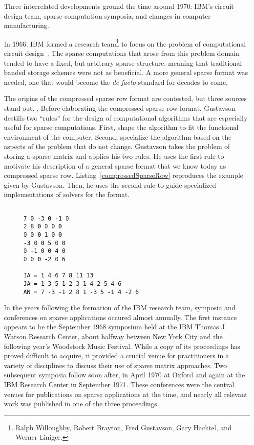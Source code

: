 Three interrelated developments ground the time around 1970: IBM's circuit design team, sparse computation symposia, and changes in computer manufacturing. 

In 1966, IBM formed a research team\footnote{Ralph Willoughby, Robert Brayton, Fred Gustavson, Gary Hachtel, and Werner Liniger.} to focus on the problem of computational circuit design~\cite{willoughby1971sparse}.
The sparse computations that arose from this problem domain tended to have a fixed, but arbitrary sparse structure, meaning that traditional banded storage schemes were not as beneficial.
A more general sparse format was needed, one that would become the \textit{de facto} standard for decades to come.

The origins of the compressed sparse row format are contested, but three sources stand out. 
, 
Before elaborating the compressed sparse row format, Gustavson~\cite{gustavson1972some} destills two \enquote{rules} for the design of computational algorithms that are especially useful for sparse computations. 
First, shape the algorithm to fit the functional environment of the computer. 
Second, specialize the algorithm based on the aspects of the problem that do not change.
Gustavson takes the problem of storing a sparse matrix and applies his two rules. 
He uses the first rule to motivate his description of a general sparse format that we know today as compressed sparse row. 
Listing~\ref{compressedSparseRow} reproduces the example given by Gustavson.
Then, he uses the second rule to guide specialized implementations of solvers for the format. 
\begin{figure}
\begin{lstlisting}[caption={Example of compressed sparse row storage given by~\cite{gustavson1972some}},label=compressedSparseRow]

7 0 -3 0 -1 0
2 8 0 0 0 0
0 0 0 1 0 0 
-3 0 0 5 0 0
0 -1 0 0 4 0 
0 0 0 -2 0 6

IA = 1 4 6 7 8 11 13
JA = 1 3 5 1 2 3 1 4 2 5 4 6
AN = 7 -3 -1 2 8 1 -3 5 -1 4 -2 6
\end{lstlisting}
\end{figure}


In the years following the formation of the IBM research team, symposia and conferences on sparse applications occured almost annually. 
The first instance appears to be the September 1968 symposium held at the IBM Thomas J. Watson Research Center, about halfway between New York City and the following year's Woodstock Music Festival. 
While a copy of its proceedings has proved difficult to acquire, it provided a crucial venue for practitioners in a variety of disciplines to discuss their use of sparse matrix approaches.
Two subsequent symposia follow soon after, in April 1970 at Oxford and again at the IBM Research Center in September 1971.
These conferences were the central venues for publications on sparse applications at the time, and nearly all relevant work was published in one of the three proceedings.

